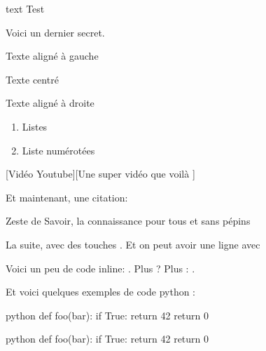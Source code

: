 \documentclass[small]{zmdocumentdd}
\begin{document}
\begin{Spoiler}
\begin{CodeBlock}{text}
Test
\end{CodeBlock}
\end{Spoiler}

\begin{Spoiler}
Voici un dernier secret.
\end{Spoiler}

\begin{flushleft}
Texte aligné à gauche
\end{flushleft}

\begin{center}
Texte centré
\end{center}

\begin{flushright}
Texte aligné à droite
\end{flushright}

\begin{enumerate}
\item Listes
\item Liste numérotées
\end{enumerate}

[Vidéo Youtube][Une super vidéo que voilà ]


Et maintenant, une citation:

\begin{Quotation}[Clem]
Zeste de Savoir, la connaissance pour tous et sans pépins 
\end{Quotation}

La suite, avec des touches . Et on peut avoir une ligne avec

\horizontalLine

Voici un peu de code inline: . Plus ? Plus : .


Et voici quelques exemples de code python :

\begin{CodeBlock}{python}
def foo(bar):
    if True:
        return 42
    return 0
\end{CodeBlock}

\begin{CodeBlock}{python}
def foo(bar):
    if True:
        return 42
    return 0
\end{CodeBlock}
\end{document}

